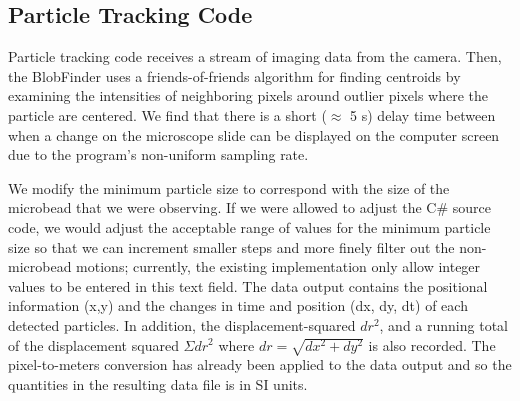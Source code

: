 \documentclass[iop,revtex4]{emulateapj_mod}
\begin{document}
\subsection{Particle Tracking Code} \label{track}
\par Particle tracking code receives a stream of imaging data from the camera. Then, the BlobFinder uses a friends-of-friends algorithm for finding centroids by examining the intensities of neighboring pixels around outlier pixels  where the particle  are centered. We find that there is a short ($\approx$ 5 s) delay time between when a change on the microscope slide can be displayed on the computer screen due to the program's non-uniform sampling rate.
\par We modify the minimum particle size to correspond with the size of the microbead that we were observing.  If we were allowed to adjust the C\# source code, we would adjust the acceptable range of values for the minimum particle size so that we can increment smaller steps and more finely filter out the non-microbead motions; currently, the existing implementation only allow integer values to be entered in this text field. 
The data output contains the positional information (x,y) and the changes in time and position (dx, dy, dt) of each detected particles. In addition,  the displacement-squared $dr^2$, and a running total of the displacement squared $\Sigma dr^2$ where $dr = \sqrt{dx^2+dy^2}$ is also recorded. The pixel-to-meters conversion has already been applied to the data output and so the quantities in the resulting data file is in SI units.
\end{document}
